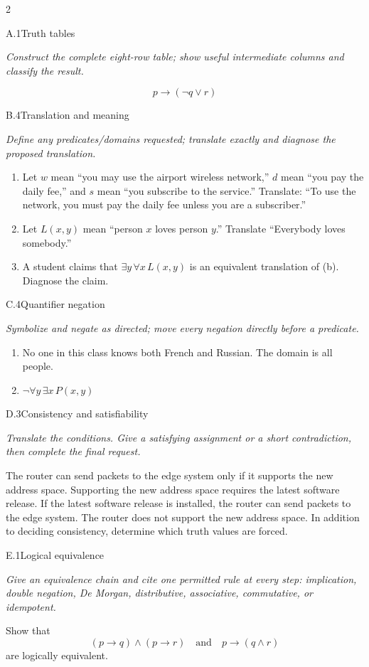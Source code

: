 \documentclass[9pt]{extarticle}
\begin{document}
\begin{multicols}{2}
\begin{CoreProblem}{A.1}{Truth tables}
{\scriptsize\textit{Construct the complete eight-row table; show useful intermediate columns and classify the result.}\par}
\[
  p\to(\neg q\lor r)
\]
\end{CoreProblem}
\begin{CoreProblem}{B.4}{Translation and meaning}
{\scriptsize\textit{Define any predicates/domains requested; translate exactly and diagnose the proposed translation.}\par}
\begin{enumerate}[label=(\alph*)]
  \item Let $w$ mean ``you may use the airport wireless network,'' $d$ mean
        ``you pay the daily fee,'' and $s$ mean ``you subscribe to the
        service.'' Translate: ``To use the network, you must pay the daily fee
        unless you are a subscriber.''
  \item Let $L(x,y)$ mean ``person $x$ loves person $y$.'' Translate
        ``Everybody loves somebody.''
  \item A student claims that $\exists y\,\forall x\,L(x,y)$ is an equivalent
        translation of (b). Diagnose the claim.
\end{enumerate}
\end{CoreProblem}
\begin{CoreProblem}{C.4}{Quantifier negation}
{\scriptsize\textit{Symbolize and negate as directed; move every negation directly before a predicate.}\par}
\begin{enumerate}[label=(\alph*)]
  \item No one in this class knows both French and Russian. The domain is all
        people.
  \item $\neg\forall y\,\exists x\,P(x,y)$
\end{enumerate}
\end{CoreProblem}
\columnbreak
\begin{CoreProblem}{D.3}{Consistency and satisfiability}
{\scriptsize\textit{Translate the conditions. Give a satisfying assignment or a short contradiction, then complete the final request.}\par}
The router can send packets to the edge system only if it supports the new
address space. Supporting the new address space requires the latest software
release. If the latest software release is installed, the router can send
packets to the edge system. The router does not support the new address space.
In addition to deciding consistency, determine which truth values are forced.
\end{CoreProblem}
\begin{CoreProblem}{E.1}{Logical equivalence}
{\scriptsize\textit{Give an equivalence chain and cite one permitted rule at every step: implication, double negation, De Morgan, distributive, associative, commutative, or idempotent.}\par}
Show that
\[
  (p\to q)\land(p\to r)
  \quad\text{and}\quad
  p\to(q\land r)
\]
are logically equivalent.
\end{CoreProblem}
\end{multicols}
\end{document}
